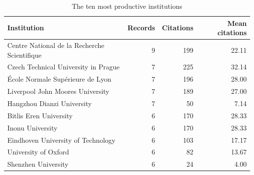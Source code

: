 \begin{table}[!ht]
\caption{The ten most productive institutions}
\centering
\small
\begin{tabularx}{\textwidth}{@{}Yrrr@{}}
\toprule
Institution & Records & Citations & Mean citations \\
\midrule
Centre National de la Recherche Scientifique & 9 & 199 & 22.11 \\
Czech Technical University in Prague & 7 & 225 & 32.14 \\
École Normale Supérieure de Lyon & 7 & 196 & 28.00 \\
Liverpool John Moores University & 7 & 189 & 27.00 \\
Hangzhou Dianzi University & 7 & 50 & 7.14 \\
Bitlis Eren University & 6 & 170 & 28.33 \\
Inonu University & 6 & 170 & 28.33 \\
Eindhoven University of Technology & 6 & 103 & 17.17 \\
University of Oxford & 6 & 82 & 13.67 \\
Shenzhen University & 6 & 24 & 4.00 \\
\bottomrule
\end{tabularx}
\end{table}
